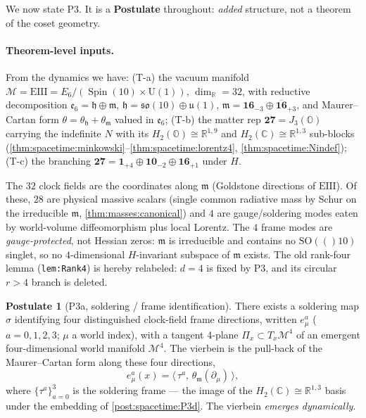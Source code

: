 \documentclass[11pt]{article}
\theoremstyle{plain}
\theoremstyle{definition}
\newtheorem{postulate}[theorem]{Postulate}
\theoremstyle{remark}
\newcommand{\SO}[1]{\mathrm{SO}(#1)}
\newcommand{\U}[1]{\mathrm{U}(#1)}
\newcommand{\Spin}{\operatorname{Spin}}
\newcommand{\Uone}{\U{1}}
\newcommand{\EIII}{\mathrm{EIII}}
\begin{document}
We now state P3. It is a \textbf{Postulate} throughout: \emph{added} structure, not a
theorem of the coset geometry.

\paragraph{Theorem-level inputs.}
From the dynamics we have: (T-a) the vacuum manifold
$\mathcal M=\EIII=E_6/(\Spin(10)\times\Uone)$, $\dim_{\mathbb R}=32$, with reductive
decomposition $\mathfrak e_6=\mathfrak h\oplus\mathfrak m$,
$\mathfrak h=\mathfrak{so}(10)\oplus\mathfrak u(1)$,
$\mathfrak m=\mathbf{16}_{-3}\oplus\overline{\mathbf{16}}_{+3}$, and Maurer--Cartan
form $\theta=\theta_{\mathfrak h}+\theta_{\mathfrak m}$ valued in $\mathfrak e_6$;
(T-b) the matter rep $\mathbf{27}=J_3(\mathbb O)$ carrying the indefinite $N$ with its
$H_2(\mathbb O)\cong\mathbb R^{1,9}$ and $H_2(\mathbb C)\cong\mathbb R^{1,3}$ sub-blocks
(\autoref{thm:spacetime:minkowski}--\autoref{thm:spacetime:lorentz4},
\autoref{thm:spacetime:Nindef}); (T-c) the branching
$\mathbf{27}=\mathbf 1_{+4}\oplus\mathbf{10}_{-2}\oplus\mathbf{16}_{+1}$ under $H$.

The $32$ clock fields are the coordinates along $\mathfrak m$ (Goldstone directions of
$\EIII$). Of these, $28$ are physical massive scalars (single common radiative mass by
Schur on the irreducible $\mathfrak m$, \autoref{thm:masses:canonical}) and $4$ are
gauge/soldering modes eaten by world-volume diffeomorphism plus local Lorentz. The $4$
frame modes are \emph{gauge-protected}, not Hessian zeros: $\mathfrak m$ is
irreducible and contains no $\SO(10)$ singlet, so no $4$-dimensional $H$-invariant
subspace of $\mathfrak m$ exists. The old rank-four lemma (\texttt{lem:Rank4}) is
hereby relabeled: $d=4$ is fixed by P3, and its circular $r>4$ branch is deleted.

\begin{postulate}[P3a, soldering / frame identification]\label{post:spacetime:P3a}
There exists a soldering map $\sigma$ identifying four distinguished clock-field frame
directions, written $e^a_\mu$ ($a=0,1,2,3$; $\mu$ a world index), with a tangent
4-plane $\Pi_x\subset T_x\mathcal M^4$ of an emergent four-dimensional world manifold
$\mathcal M^4$. The vierbein is the pull-back of the Maurer--Cartan form along these
four directions,
\begin{equation}\label{eq:spacetime:vierbein}
  e^a_\mu(x)=\bigl\langle\,\tau^a,\,\theta_{\mathfrak m}(\partial_\mu)\,\bigr\rangle,
\end{equation}
where $\{\tau^a\}_{a=0}^{3}$ is the soldering frame --- the image of the
$H_2(\mathbb C)\cong\mathbb R^{1,3}$ basis under the embedding of
\autoref{post:spacetime:P3d}. The vierbein \emph{emerges dynamically}.
\end{postulate}
\end{document}

